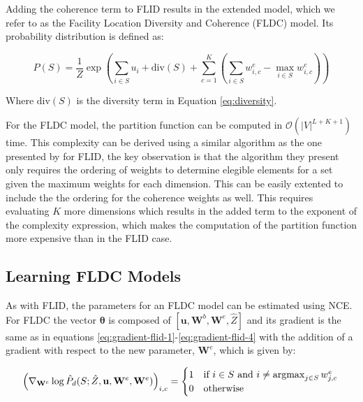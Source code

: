 Adding the coherence term to FLID results in the extended model, which we refer to as the Facility Location Diversity and Coherence (FLDC) model. Its probability distribution is defined as:

\begin{equation}
  \tag{FLDC}
  P(S) = \frac{1}{Z}\exp{\left(\sum_{i \in S}{u_{i}} + \mathrm{div}(S) + \sum_{c=1}^{K}{\left(\sum_{i \in S}{w^{e}_{i,c}} - \max_{i \in S}{w^{e}_{i,c}}\right)}\right)}
  \label{eq:fldc}
\end{equation}

Where $\mathrm{div}(S)$ is the diversity term in Equation \eqref{eq:diversity}.

For the FLDC model, the partition function can be computed in $\mathcal{O}(|V|^{L+K+1})$ time. This complexity can be derived using a similar algorithm as the one presented by \citet{tschiatschek16learning} for FLID, the key observation is that the algorithm they present only requires the ordering of weights to determine elegible elements for a set given  the maximum weights for each dimension. This can be easily extented to include the the ordering for the coherence weights as well. This requires evaluating $K$ more dimensions which results in the added term to the exponent of the complexity expression, which makes the computation of the partition function more expensive than in the FLID case.

\subsection{Learning FLDC Models}

As with FLID, the parameters for an FLDC model can be estimated using NCE. For FLDC the vector $\boldsymbol{\theta}$ is composed of $[\mathbf{u}, \mathbf{W}^{b}, \mathbf{W}^{e}, \hat{Z}]$ and its gradient is the same as in equations \eqref{eq:gradient-flid-1}-\eqref{eq:gradient-flid-4} with the addition of a gradient with respect to the new parameter, $\mathbf{W}^{e}$, which is given by:

\begin{equation}
\left(\nabla_{\mathbf{W}^{e}}\log{\hat{P}_{d}(S; \hat{Z}, \mathbf{u}, \mathbf{W}^{e}, \mathbf{W}^{e})}\right)_{i,c} = \begin{cases}
1 & \text{if}\ i \in S\ \text{and}\ i \neq \operatorname*{argmax}_{j \in S}{w^{e}_{j,c}} \\
0 & \text{otherwise}
\end{cases} \label{eq:sub-fldc}\\
\end{equation}

